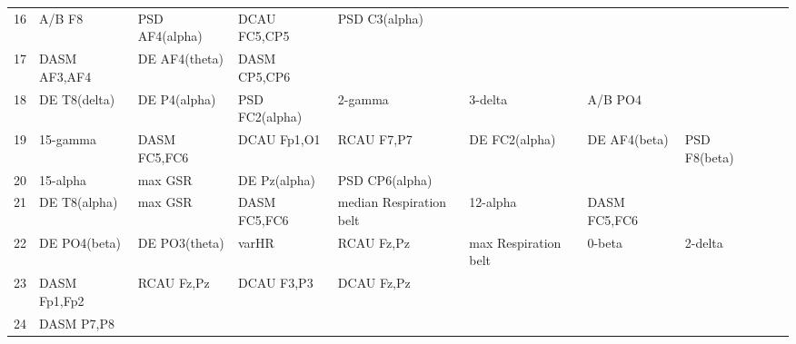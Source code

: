 \begin{landscape}
\begin{table}[]
\begin{tabular}{l|llllllll}
16       & A/B F8                & PSD AF4(alpha)        & DCAU FC5,CP5         & PSD C3(alpha)           &                         &                      &                      &                       &                       &                    \\
17       & DASM AF3,AF4          & DE AF4(theta)         & DASM CP5,CP6         &                         &                         &                      &                      &                       &                       &                    \\
18       & DE T8(delta)          & DE P4(alpha)          & PSD FC2(alpha)       & 2-gamma                 & 3-delta                 & A/B PO4              &                      &                       &                       &                    \\
19       & 15-gamma              & DASM FC5,FC6          & DCAU Fp1,O1          & RCAU F7,P7              & DE FC2(alpha)           & DE AF4(beta)         & PSD F8(beta)         &                       &                       &                    \\
20       & 15-alpha              & max GSR               & DE Pz(alpha)         & PSD CP6(alpha)          &                         &                      &                      &                       &                       &                    \\
21       & DE T8(alpha)          & max GSR               & DASM FC5,FC6         & median Respiration belt & 12-alpha                & DASM FC5,FC6         &                      &                       &                       &                    \\
22       & DE PO4(beta)          & DE PO3(theta)         & varHR                & RCAU Fz,Pz              & max Respiration belt    & 0-beta               & 2-delta              &                       &                       &                    \\
23       & DASM Fp1,Fp2          & RCAU Fz,Pz            & DCAU F3,P3           & DCAU Fz,Pz              &                         &                      &                      &                       &                       &                    \\
24       & DASM P7,P8            &                       &                      &                         &                         &                      &                      &                       &                       &                    \\

\end{tabular}
\end{table}
\end{landscape}
